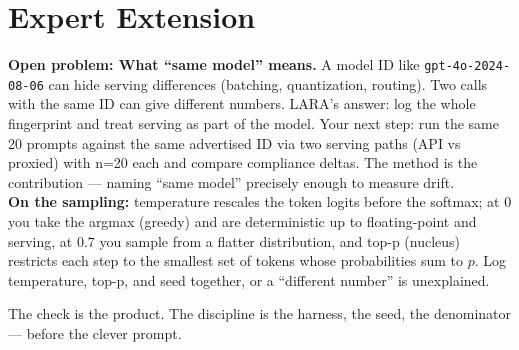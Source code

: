 
\section{Expert Extension}
\rbadge
\textbf{Open problem: What ``same model'' means.} A model ID like \texttt{gpt-4o-2024-08-06} can hide serving differences (batching, quantization, routing). Two calls with the same ID can give different numbers. LARA's answer: log the whole fingerprint and treat serving as part of the model. Your next step: run the same 20 prompts against the same advertised ID via two serving paths (API vs proxied) with n=20 each and compare compliance deltas. The method is the contribution — naming ``same model'' precisely enough to measure drift.\\
\textbf{On the sampling:} temperature rescales the token logits before the softmax; at $0$ you take the argmax (greedy) and are deterministic up to floating-point and serving, at $0.7$ you sample from a flatter distribution, and top-p (nucleus) restricts each step to the smallest set of tokens whose probabilities sum to $p$. Log temperature, top-p, and seed together, or a ``different number'' is unexplained.

\begin{checkbox}
The check is the product. The discipline is the harness, the seed, the denominator — before the clever prompt.
\end{checkbox}
